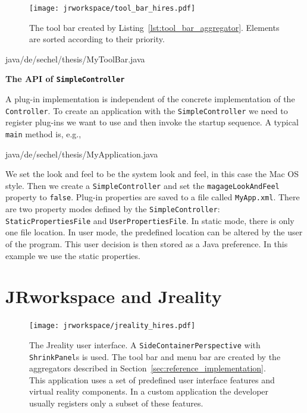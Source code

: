 \documentclass[Thesis.tex]{subfiles}
\begin{document}
\begin{figure}[H]
\centering
\texttt{[image: jrworkspace/tool\_bar\_hires.pdf]}
\caption{The tool bar created by Listing~\ref{lst:tool_bar_aggregator}. Elements are sorted according to their
priority.}
\label{fig:tool_bar_aggregator}
\end{figure}

 {java/de/sechel/thesis/MyToolBar.java}

{\bf The API of {\tt SimpleController}}

A plug-in implementation is independent of the concrete implementation of the {\tt Controller}. To create an
application with the {\tt SimpleController} we need to register plug-ins we want to use and then invoke the
startup sequence. A typical {\tt main} method is, e.g.,

 {java/de/sechel/thesis/MyApplication.java}

We set the look and feel to be the system look and feel, in this case the Mac OS style. Then we create a
{\tt SimpleController} and set the {\tt magageLookAndFeel} property to {\tt false}. Plug-in properties are saved
to a file called {\tt MyApp.xml}. There are two property modes defined by the {\tt SimpleController}: {\tt StaticPropertiesFile}
and {\tt UserPropertiesFile}. In static mode, there is only one file location. In user mode, the predefined location can
be altered by the user of the program. This user decision is then stored as a {\sc Java} preference. In this example 
we use the static properties.

\section{{\sc JRworkspace} and {\sc Jreality}}
\label{sec:jrworkspace_jreality}

\begin{figure}
\centering
\texttt{[image: jrworkspace/jreality\_hires.pdf]}
\caption[The {\sc Jreality} user interface.]{The {\sc Jreality} user interface. A {\tt SideContainerPerspective} 
with {\tt ShrinkPanel}s is used. The tool bar and 
menu bar are created by the aggregators described in Section~\ref{sec:reference_implementation}. This application
uses a set of predefined user interface features and virtual reality components. In a custom application the developer 
usually registers only a subset of these features.}
\label{fig:jrworkspace_jreality}
\end{figure}
\end{document}
